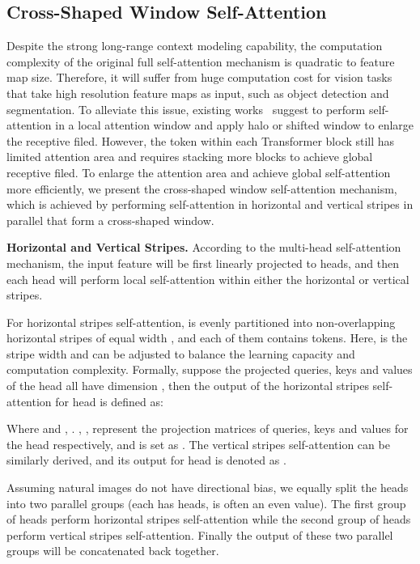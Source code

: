\documentclass[10pt,twocolumn,letterpaper]{article}
\begin{document}
\subsection{Cross-Shaped Window Self-Attention}
Despite the strong long-range context modeling capability, the computation complexity of the original full self-attention mechanism is quadratic to feature map size. Therefore, it will suffer from huge computation cost for vision tasks that take high resolution feature maps as input, such as object detection and segmentation. To alleviate this issue, existing works~\cite{liu2021swin, vaswani2021scaling} suggest to perform self-attention in a local attention window and apply halo or shifted window to enlarge the receptive filed. However, the token within each Transformer block still has limited attention area and requires stacking more blocks to achieve global receptive filed. To enlarge the attention area and achieve global self-attention more efficiently, we present the cross-shaped window self-attention mechanism, which is achieved by performing self-attention in horizontal and vertical stripes in parallel that form a cross-shaped window.

\noindent \textbf{Horizontal and Vertical Stripes.}
According to the multi-head self-attention mechanism, the input feature  will be first linearly projected to  heads, and then each head will perform local self-attention within either the horizontal or vertical stripes. 


For horizontal stripes self-attention,  is evenly partitioned into non-overlapping horizontal stripes  of equal width , and each of them contains  tokens.
Here,  is the stripe width and can be adjusted to balance the learning capacity and computation complexity. Formally, suppose the projected queries, keys and values of the  head all have dimension , then the output of the horizontal stripes self-attention for  head is defined as:


Where  and , . , ,  represent the projection  matrices of queries, keys and values for the  head respectively, and  is set as .  The vertical stripes self-attention can be similarly derived, and its output for  head is denoted as .

Assuming natural images do not have directional bias, we equally split the  heads into two parallel groups (each has  heads,  is often an even value). The first group of heads perform horizontal stripes self-attention  while the second group of heads perform vertical stripes self-attention. Finally the output of these two parallel groups will be concatenated back together.
\begin{small}
\vspace{-1mm}

\vspace{-3mm}
\end{small}
\end{document}
